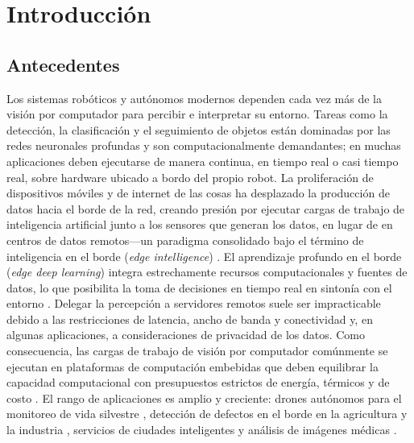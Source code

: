 %

\chapter{Introducción}
\label{chap:introduction}

\section{Antecedentes}
\label{sec:background}

Los sistemas robóticos y autónomos modernos dependen cada vez más de la visión
por computador para percibir e interpretar su entorno. Tareas como la
detección, la clasificación y el seguimiento de objetos están dominadas por
las redes neuronales profundas y son computacionalmente demandantes; en
muchas aplicaciones deben ejecutarse de manera continua, en tiempo real o
casi tiempo real, sobre hardware ubicado a bordo del propio robot. La
proliferación de dispositivos móviles y de internet de las cosas ha
desplazado la producción de datos hacia el borde de la red, creando presión
por ejecutar cargas de trabajo de inteligencia artificial junto a los
sensores que generan los datos, en lugar de en centros de datos remotos---un
paradigma consolidado bajo el término de inteligencia en el borde
(\emph{edge intelligence}) \cite{zhou2019, deng2020}. El aprendizaje profundo
en el borde (\emph{edge deep learning}) integra estrechamente recursos
computacionales y fuentes de datos, lo que posibilita la toma de decisiones
en tiempo real en sintonía con el entorno \cite{xu2025}. Delegar la
percepción a servidores remotos suele ser impracticable debido a las
restricciones de latencia, ancho de banda y conectividad y, en algunas
aplicaciones, a consideraciones de privacidad de los datos.
Como consecuencia, las cargas de trabajo de visión por computador comúnmente
se ejecutan en plataformas de computación embebidas que deben equilibrar la
capacidad computacional con presupuestos estrictos de energía, térmicos y de
costo \cite{zhou2019, xu2025}. El rango de aplicaciones es amplio y
creciente: drones autónomos para el monitoreo de vida silvestre
\cite{lundquist2026}, detección de defectos en el borde en la agricultura y
la industria \cite{muchtar2025, machado2025}, servicios de ciudades
inteligentes \cite{woo2025} y análisis de imágenes médicas \cite{aalishah2025}.

